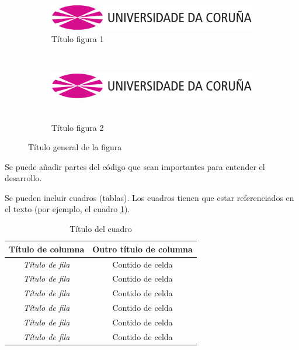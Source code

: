 \begin{figure}[hp!]
  \centering
  \begin{subfigure}[c]{0.3\textwidth}
    \includegraphics[angle=45,width=\textwidth]{imaxes/udc.png}
    \caption{Título figura 1}
    \label{fig:subfigura-rotada}
  \end{subfigure}
  \hspace{0.1\textwidth}
  \begin{subfigure}[c]{0.3\textwidth}
    \includegraphics[width=\textwidth,height=3cm]{imaxes/udc.png}
    \caption{Título figura 2}
    \label{fig:subfigura-deformada}
  \end{subfigure}
  \caption{Título general de la figura}
  \label{fig:exemplo-subfiguras}
\end{figure}

Se puede añadir partes del código que sean importantes para entender el desarrollo.

Se pueden incluir cuadros (tablas). Los cuadros tienen que estar referenciados en el texto (por ejemplo, el cuadro \ref{tab:exemplo}).

\begin{table}[hp!]
  \centering
  \begin{tabular}{c|c}
  \rowcolor{udcpink!25}
  \textbf{Título de columna} & \textbf{Outro título de columna} \\\hline
  \textit{Título de fila} & Contido de celda \\
  \textit{Título de fila} & Contido de celda \\
  \textit{Título de fila} & Contido de celda \\
  \textit{Título de fila} & Contido de celda \\
  \textit{Título de fila} & Contido de celda \\
  \textit{Título de fila} & Contido de celda \\
  \end{tabular}
  \caption{Título del cuadro}
  \label{tab:exemplo}
\end{table}




